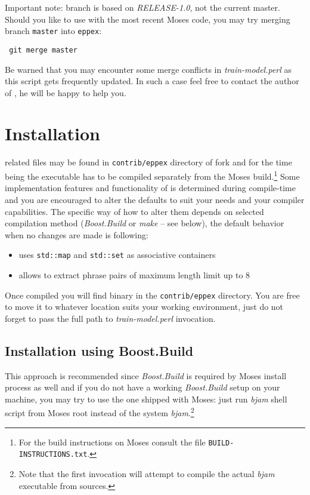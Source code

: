 Important note: \eppex{} branch is based on \emph{RELEASE-1.0},
not the current master. Should you like to use \eppex{} with the most
recent Moses code, you may try merging branch \texttt{master} into \texttt{eppex}:
\begin{verbatim}
 git merge master
\end{verbatim}

Be warned that you may encounter some merge conflicts in \emph{train-model.perl}
as this script gets frequently updated.
In such a case feel free to contact the author of \eppex{},
he will be happy to help you.

\section*{Installation}

\Eppex{} related files may be found in \texttt{contrib/eppex} directory of \eppex{} fork
and for the time being the executable has to be compiled separately from the Moses
build.\footnote{For the build instructions on Moses consult the file \texttt{BUILD-INSTRUCTIONS.txt}.}
Some implementation features and functionality of \eppex{} is determined during compile-time
and you are encouraged to alter the defaults to suit your needs and your compiler capabilities.
The specific way of how to alter them depends on selected compilation method (\emph{Boost.Build} or
\emph{make} -- see below), the default behavior when no changes are made is following:
\begin{itemize}
  \item \eppex{} uses \verb|std::map| and \verb|std::set| as associative containers
  \item \eppex{} allows to extract phrase pairs of maximum length limit up to 8
\end{itemize}

Once compiled you will find \eppex{} binary in the \texttt{contrib/eppex} directory.
You are free to move it to whatever location suits your working environment,
just do not forget to pass the full path to \emph{train-model.perl} invocation.

\subsection*{Installation using Boost.Build}

This approach is recommended since \emph{Boost.Build}
is required by Moses install process as well and if you do not have a working
\emph{Boost.Build} setup on your machine, you may try to use the one shipped with Moses:
just run \emph{bjam} shell script from Moses root instead of the system \emph{bjam}.\footnote{Note
that the first invocation will attempt to compile the actual \emph{bjam} executable from sources.}

